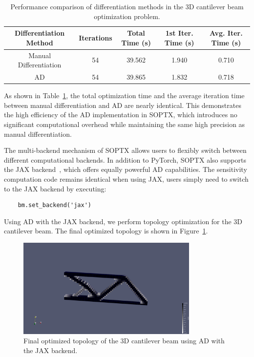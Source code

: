 \documentclass[mathpazo]{cicp}
\begin{document}
\begin{table}[htbp]
	\centering
	\setlength{\tabcolsep}{4pt} %
	\caption{Performance comparison of differentiation methods in the 3D cantilever beam optimization problem.}
	\begin{tabular}{ccccc}
		\toprule
		\textbf{Differentiation Method} & \textbf{Iterations} & \textbf{Total Time (s)} & \textbf{1st Iter. Time (s)} & \textbf{Avg. Iter. Time (s)} \\
		\midrule
		Manual Differentiation & 54 & 39.562 & 1.940 & 0.710 \\
		AD & 54 & 39.865 & 1.832 & 0.718 \\
		\bottomrule
	\end{tabular}
	\label{tab:ad_vs_manual}
\end{table}

As shown in Table~\ref{tab:ad_vs_manual}, the total optimization time and the average iteration time between manual differentiation and AD are nearly identical. This demonstrates the high efficiency of the AD implementation in SOPTX, which introduces no significant computational overhead while maintaining the same high precision as manual differentiation.

The multi-backend mechanism of SOPTX allows users to flexibly switch between different computational backends. In addition to PyTorch, SOPTX also supports the JAX backend~\cite{bradbury2018jax}, which offers equally powerful AD capabilities. The sensitivity computation code remains identical when using JAX, users simply need to switch to the JAX backend by executing:
\begin{lstlisting}
	bm.set_backend('jax')
\end{lstlisting}

Using AD with the JAX backend, we perform topology optimization for the 3D cantilever beam. The final optimized topology is shown in Figure~\ref{fig:canti3d_ad_jax}.

\begin{figure}[htp] 
	\centering 
	\includegraphics[width=0.8\textwidth]{figures/cantilever_3d_auto_jax.png} \caption{Final optimized topology of the 3D cantilever beam using AD with the JAX backend.} \label{fig:canti3d_ad_jax} 
\end{figure}
\end{document}
